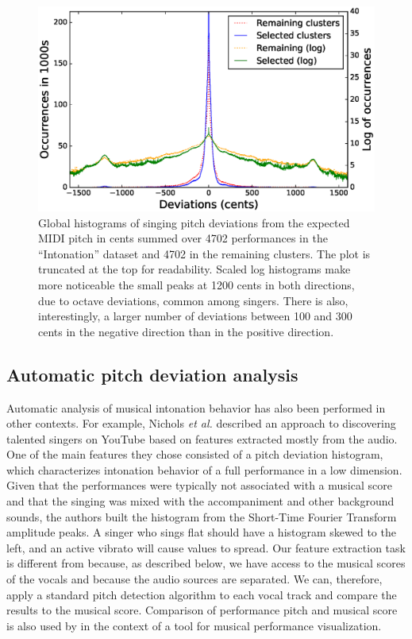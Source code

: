 \begin{figure}[h!]
    \centering
    \includegraphics[width=\textwidth]{figures/full_histograms_comparison.eps}
    \caption{Global histograms of singing pitch deviations from the expected MIDI pitch in cents summed over 4702 performances in the ``Intonation'' dataset and 4702 in the remaining clusters. The plot is truncated at the top for readability. Scaled log histograms make more noticeable the small peaks at 1200 cents in both directions, due to octave deviations, common among singers. There is also, interestingly, a larger number of deviations between 100 and 300 cents in the negative direction than in the positive direction.}
    \label{fig:full_hist}
\end{figure}

\subsection{Automatic pitch deviation analysis}
Automatic analysis of musical intonation behavior has also been performed in other contexts. For example, Nichols \textit{et al.} \cite{nichols2012automatically} described an approach to discovering talented singers on YouTube based on features extracted mostly from the audio. One of the main features they chose consisted of a pitch deviation histogram, which characterizes intonation behavior of a full performance in a low dimension. Given that the performances were typically not associated with a musical score and that the singing was mixed with the accompaniment and other background sounds, the authors built the histogram from the Short-Time Fourier Transform amplitude peaks. A singer who sings flat should have a histogram skewed to the left, and an active vibrato will cause values to spread. Our feature extraction task is different from \cite{nichols2012automatically} because, as described below, we have access to the musical scores of the vocals and because the audio sources are separated. We can, therefore, apply a standard pitch detection algorithm to each vocal track and compare the results to the musical score. Comparison of performance pitch and musical score is also used by \cite{lim2010intune} in the context of a tool for musical performance visualization.


